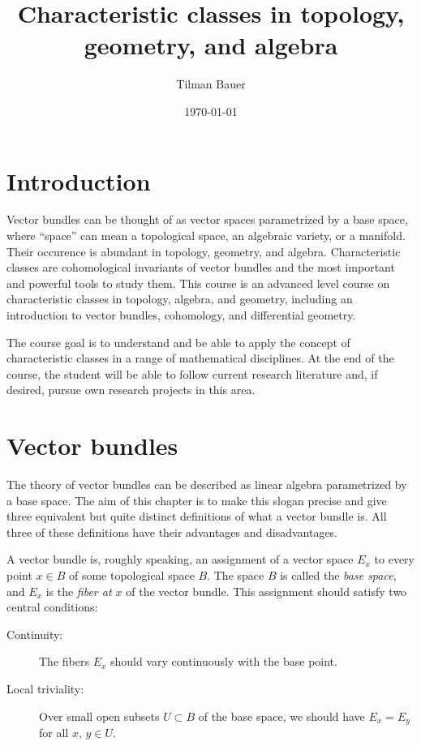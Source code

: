 \documentclass[a4paper,openany]{scrbook}
\title{Characteristic classes in topology, geometry, and algebra}
\author{Tilman Bauer}
\date{\today{}}
\begin{document}
\frontmatter
\maketitle

\mainmatter

\chapter{Introduction}

Vector bundles can be thought of as vector spaces parametrized by a base space, where ``space'' can mean a topological space, an algebraic variety, or a manifold. Their occurence is abundant in topology, geometry, and algebra. Characteristic classes are cohomological invariants of vector bundles and the most important and powerful tools to study them. This course is an advanced level course on characteristic classes in topology, algebra, and geometry, including an introduction to vector bundles, cohomology, and differential geometry.

The course goal is to understand and be able to apply the concept of characteristic classes in a range of mathematical disciplines. At the end of the course, the student will be able to follow current research literature and, if desired, pursue own research projects in this area.



\tableofcontents

\chapter{Vector bundles}

The theory of vector bundles can be described as linear algebra parametrized by a base space. The aim of this chapter is to make this slogan precise and give three equivalent but quite distinct definitions of what a vector bundle is. All three of these definitions have their advantages and disadvantages.

A vector bundle is, roughly speaking, an assignment of a vector space $E_x$ to every point $x \in B$ of some topological space $B$. The space $B$ is called the \emph{base space}, and $E_x$ is the \emph{fiber at $x$} of the vector bundle. This assignment should satisfy two central conditions:

\begin{description}
\item[Continuity:] The fibers $E_x$ should vary continuously with the base point.
\item[Local triviality:] Over small open subsets $U \subset B$ of the base space, we should have $E_x = E_y$ for all $x$, $y \in U$.
\end{description}
\end{document}

